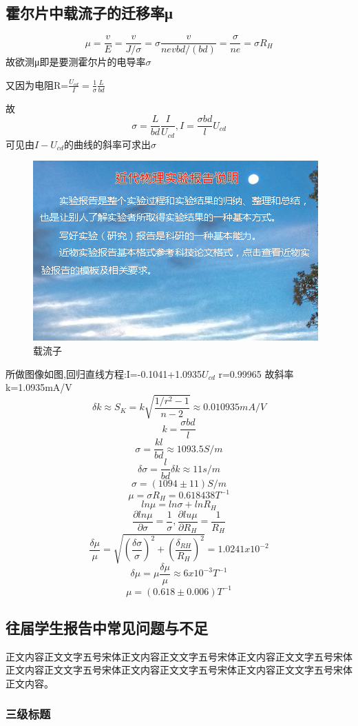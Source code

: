 \documentclass{thuemp}
\begin{document}
\subsection{霍尔片中载流子的迁移率μ}
\[\mu=\frac{v}{E}=\frac{v}{J/\sigma}=\sigma\frac{v}{nevbd/(bd)}=\frac{\sigma}{ne}=\sigma R_{H}\]
故欲测μ即是要测霍尔片的电导率$\sigma$

又因为电阻R=$ \frac{U_{cd}}{I}=\frac{1}{\sigma}\frac{L}{bd} $

故
\[\sigma = \frac{L}{bd}\frac{I}{U_{cd}},I=\frac{\sigma bd}{l}U_{cd}\]
可见由$I-U_{cd}$的曲线的斜率可求出$\sigma$
\begin{figure}[H]
	\centering
	\includegraphics[width=0.8\linewidth]{./image/example.jpg}
	\caption{载流子} \label{fig:eg}
\end{figure}
所做图像如图,回归直线方程:I=-0.1041+1.0935$U_{cd}$
r=0.99965
故斜率k=1.0935mA/V
\[\delta k \approx S_{K}=k\sqrt{\frac{1/r^{2}-1}{n-2}}\approx0.010935mA/V\]
\[k=\frac{\sigma bd}{l}\]
\[\sigma=\frac{k l}{b d}\approx1093.5S/m\]
\[\delta \sigma =\frac{l}{bd}\delta k\approx11s/m\]
\[\sigma=(1094\pm11)S/m\]
\[\mu=\sigma R_{H}=0.618438T^{-1}\]
\[ln\mu=ln\sigma+lnR_{H}\]
\[\frac{\partial ln \mu}{\partial \sigma}=\frac{1}{\sigma},\frac{\partial lu \mu}{\partial R_{H}}=\frac{1}{R_{H}}\]
\[\frac{\delta \mu}{\mu}=\sqrt{(\frac{\delta \sigma}{\sigma})^{2}+(\frac{\delta_{RH}}{R_{H}})^{2}}
=1.0241x10^{-2}\]
\[\delta \mu =\mu \frac{\delta \mu}{\mu}\approx6x10^{-3}T^{-1}\]
\[\mu=(0.618\pm0.006)T^{-1}\]


\subsection{往届学生报告中常见问题与不足}
正文内容正文文字五号宋体正文内容正文文字五号宋体正文内容正文文字五号宋体正文内容正文文字五号宋体正文内容正文文字五号宋体正文内容正文文字五号宋体正文内容。
\subsubsection{三级标题}
\end{document}
